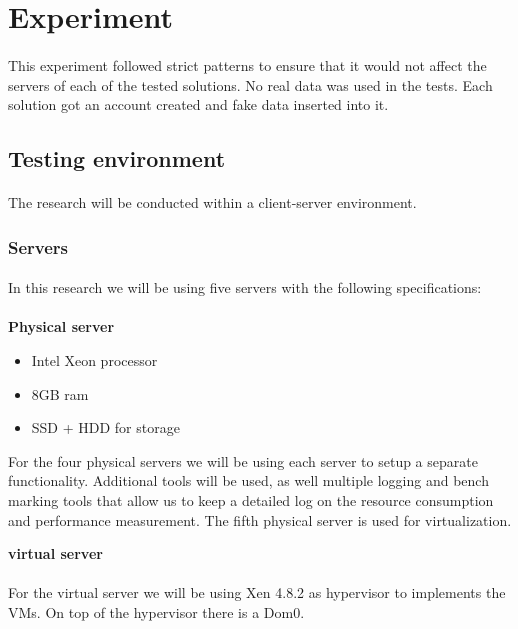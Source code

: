\section{Experiment}
\paragraph{}
This experiment followed strict patterns to ensure that it would not affect the servers of each of the tested solutions. No real data was used in the tests. Each solution got an account created and fake data inserted into it.


\subsection{Testing environment}
\paragraph{}
The research will be conducted within a client-server environment.

\subsubsection{Servers}
\paragraph{}
In this research we will be using five servers with the following specifications:\\~\\
\textbf{Physical server}
\begin{itemize}
	\item Intel Xeon processor
	\item 8GB ram
	\item SSD + HDD for storage
\end{itemize}

 For the four physical servers we will be using each server to setup a separate functionality. Additional tools will be used, as well multiple logging and bench marking tools that allow us to keep a detailed log on the resource consumption and performance measurement. The fifth physical server is used for virtualization.

\textbf{virtual server}
\paragraph{}
For the virtual server we will be using Xen 4.8.2 as hypervisor to implements the VMs. On top of the hypervisor there is a Dom0.

